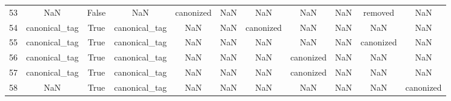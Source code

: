 \begin{table}[h!]
{\begin{tabular}{|c|c|c|c|c|c|c|c|c|c|c|}
         53 &                       NaN &                             False &                          NaN &                            canonized &                                  NaN &                                  NaN &                                  NaN &                                  NaN &                              removed &                                                NaN \\
         54 &             canonical\_tag &                              True &                canonical\_tag &                                  NaN &                                  NaN &                            canonized &                                  NaN &                                  NaN &                                  NaN &                                                NaN \\
         55 &             canonical\_tag &                              True &                canonical\_tag &                                  NaN &                                  NaN &                                  NaN &                                  NaN &                                  NaN &                            canonized &                                                NaN \\
         56 &             canonical\_tag &                              True &                canonical\_tag &                                  NaN &                                  NaN &                                  NaN &                            canonized &                                  NaN &                                  NaN &                                                NaN \\
         57 &             canonical\_tag &                              True &                canonical\_tag &                                  NaN &                                  NaN &                                  NaN &                            canonized &                                  NaN &                                  NaN &                                                NaN \\
         58 &                       NaN &                              True &                canonical\_tag &                                  NaN &                                  NaN &                                  NaN &                                  NaN &                                  NaN &                                  NaN &                                          canonized \\

\end{tabular}}
\end{table}
